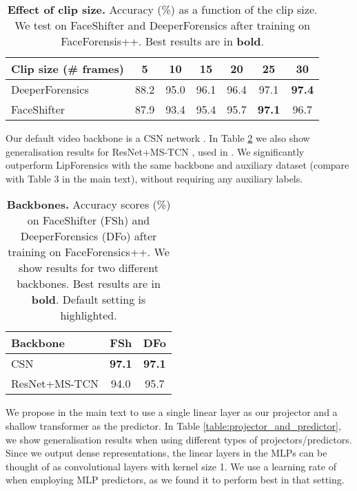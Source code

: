 \documentclass[10pt,twocolumn,letterpaper]{article}
\begin{document}
\begin{description}[wide,itemindent=\labelsep]
\begin{table}
\begin{center}
\footnotesize
\begin{tabular}{l | c c c c c c}\toprule
Clip size (\# frames) & 5 & 10 & 15 & 20 & 25 & 30 \\ \midrule
DeeperForensics & 88.2 & 95.0 & 96.1 & 96.4 & 97.1 & \textbf{97.4} \\
FaceShifter & 87.9 & 93.4 & 95.4 & 95.7 & \textbf{97.1} & 96.7 \\
 \bottomrule
\end{tabular}
\end{center}
\caption{\textbf{Effect of clip size.} Accuracy (\%) as a function of the clip size. We test on FaceShifter and DeeperForensics after training on FaceForensis++. Best results are in \textbf{bold}.}
\label{table:clip_size}
\end{table}

\item[Different backbone.] Our default video backbone is a CSN network \cite{tran2019video}. In Table \ref{table:backbone} we also show generalisation results for ResNet+MS-TCN \cite{martinez2020lipreading}, used in \cite{haliassos2021lips}. We significantly outperform LipForensics with the same backbone and auxiliary dataset (compare with Table 3 in the main text), without requiring any auxiliary labels.

\begin{table}
\begin{center}
\begin{tabular}{l c c}\toprule
Backbone & FSh & DFo \\ \midrule
\rowcolor{light-gray}
CSN & \textbf{97.1} & \textbf{97.1} \\
ResNet+MS-TCN & 94.0 & 95.7 \\ \bottomrule
\end{tabular}
\end{center}
\caption{\textbf{Backbones.} Accuracy scores (\%) on FaceShifter (FSh) and DeeperForensics (DFo) after training on FaceForensics++. We show results for two different backbones. Best results are in \textbf{bold}. Default setting is \colorbox{light-gray}{highlighted}.}
\label{table:backbone}
\end{table}

\item[Projector and predictor.] We propose in the main text to use a single linear layer as our projector and a shallow transformer as the predictor. In Table \ref{table:projector_and_predictor}, we show generalisation results when using different types of projectors/predictors. Since we output dense representations, the linear layers in the MLPs can be thought of as convolutional layers with kernel size 1. We use a learning rate of  when employing MLP predictors, as we found it to perform best in that setting. 


\end{description}
\end{document}
